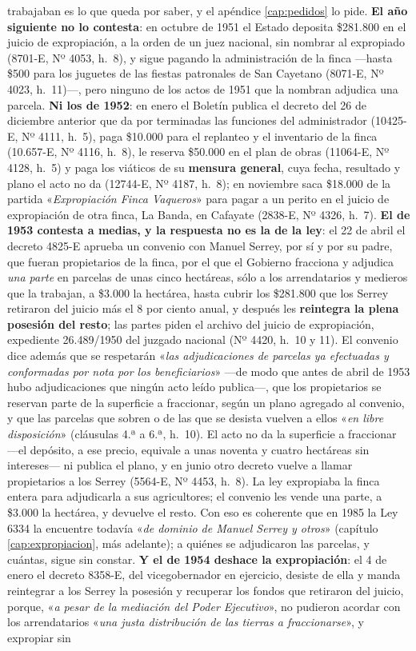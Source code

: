 \begin{cautela}
trabajaban es lo que queda por saber, y el apéndice \ref{cap:pedidos} lo pide. \textbf{El año siguiente no lo contesta}: en octubre de 1951 el Estado deposita \$281.800 en el juicio de expropiación, a la orden de un juez nacional, sin nombrar al expropiado (8701-E, Nº 4053, h.\ 8), y sigue pagando la administración de la finca ---hasta \$500 para los juguetes de las fiestas patronales de San Cayetano (8071-E, Nº 4023, h.\ 11)---, pero ninguno de los actos de 1951 que la nombran adjudica una parcela. \textbf{Ni los de 1952}: en enero el Boletín publica el decreto del 26 de diciembre anterior que da por terminadas las funciones del administrador (10425-E, Nº 4111, h.\ 5), paga \$10.000 para el replanteo y el inventario de la finca (10.657-E, Nº 4116, h.\ 8), le reserva \$50.000 en el plan de obras (11064-E, Nº 4128, h.\ 5) y paga los viáticos de su \textbf{mensura general}, cuya fecha, resultado y plano el acto no da (12744-E, Nº 4187, h.\ 8); en noviembre saca \$18.000 de la partida «\textit{Expropiación Finca Vaqueros}» para pagar a un perito en el juicio de expropiación de otra finca, La Banda, en Cafayate (2838-E, Nº 4326, h.\ 7). \textbf{El de 1953 contesta a medias, y la respuesta no es la de la ley}: el 22 de abril el decreto 4825-E aprueba un convenio con Manuel Serrey, por sí y por su padre, que fueran propietarios de la finca, por el que el Gobierno fracciona y adjudica \textit{una parte} en parcelas de unas cinco hectáreas, sólo a los arrendatarios y medieros que la trabajan, a \$3.000 la hectárea, hasta cubrir los \$281.800 que los Serrey retiraron del juicio más el 8 por ciento anual, y después les \textbf{reintegra la plena posesión del resto}; las partes piden el archivo del juicio de expropiación, expediente 26.489/1950 del juzgado nacional (Nº 4420, h.\ 10 y 11). El convenio dice además que se respetarán «\textit{las adjudicaciones de parcelas ya efectuadas y conformadas por nota por los beneficiarios}» ---de modo que antes de abril de 1953 hubo adjudicaciones que ningún acto leído publica---, que los propietarios se reservan parte de la superficie a fraccionar, según un plano agregado al convenio, y que las parcelas que sobren o de las que se desista vuelven a ellos «\textit{en libre disposición}» (cláusulas 4.ª a 6.ª, h.\ 10). El acto no da la superficie a fraccionar ---el depósito, a ese precio, equivale a unas noventa y cuatro hectáreas sin intereses--- ni publica el plano, y en junio otro decreto vuelve a llamar propietarios a los Serrey (5564-E, Nº 4453, h.\ 8). La ley expropiaba la finca entera para adjudicarla a sus agricultores; el convenio les vende una parte, a \$3.000 la hectárea, y devuelve el resto. Con eso es coherente que en 1985 la Ley 6334 la encuentre todavía «\textit{de dominio de Manuel Serrey y otros}» (capítulo \ref{cap:expropiacion}, más adelante); a quiénes se adjudicaron las parcelas, y cuántas, sigue sin constar. \textbf{Y el de 1954 deshace la expropiación}: el 4 de enero el decreto 8358-E, del vicegobernador en ejercicio, desiste de ella y manda reintegrar a los Serrey la posesión y recuperar los fondos que retiraron del juicio, porque, «\textit{a pesar de la mediación del Poder Ejecutivo}», no pudieron acordar con los arrendatarios «\textit{una justa distribución de las tierras a fraccionarse}», y expropiar sin 
\end{cautela}

